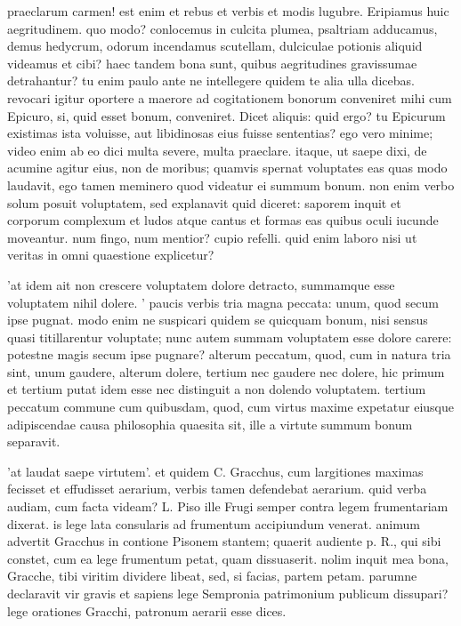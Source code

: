  praeclarum carmen! est enim et rebus et verbis et modis lugubre. Eripiamus huic aegritudinem. quo modo? conlocemus in culcita plumea, psaltriam adducamus, demus hedycrum, odorum incendamus scutellam, dulciculae potionis aliquid videamus et cibi? haec tandem bona sunt, quibus aegritudines gravissumae detrahantur? tu enim paulo ante ne intellegere quidem te alia ulla dicebas. revocari igitur oportere a maerore ad cogitationem bonorum conveniret mihi cum Epicuro, si, quid esset bonum, conveniret. Dicet aliquis: quid ergo? tu Epicurum existimas ista voluisse, aut libidinosas eius fuisse sententias? ego vero minime; video enim ab eo dici multa severe, multa praeclare. itaque, ut saepe dixi, de acumine agitur eius, non de moribus; quamvis spernat voluptates eas quas modo laudavit, ego tamen meminero quod videatur ei summum bonum. non enim verbo solum posuit voluptatem, sed explanavit quid diceret: saporem inquit et corporum complexum et ludos atque cantus et formas eas quibus oculi iucunde moveantur. num fingo, num mentior? cupio refelli. quid enim laboro nisi ut veritas in omni quaestione explicetur?

 'at idem ait non crescere voluptatem dolore detracto, summamque esse voluptatem nihil dolere. ' paucis verbis tria magna peccata: unum, quod secum ipse pugnat. modo enim ne suspicari quidem se quicquam bonum, nisi sensus quasi titillarentur voluptate; nunc autem summam voluptatem esse dolore carere: potestne magis secum ipse pugnare? alterum peccatum, quod, cum in natura tria sint, unum gaudere, alterum dolere, tertium nec gaudere nec dolere, hic primum et tertium putat idem esse nec distinguit a non dolendo voluptatem. tertium peccatum commune cum quibusdam, quod, cum virtus maxime expetatur eiusque adipiscendae causa philosophia quaesita sit, ille a virtute summum bonum separavit.

 'at laudat saepe virtutem'. et quidem C. Gracchus, cum largitiones maximas fecisset et effudisset aerarium, verbis tamen defendebat aerarium. quid verba audiam, cum facta videam? L. Piso ille Frugi semper contra legem frumentariam dixerat. is lege lata consularis ad frumentum accipiundum venerat. animum advertit Gracchus in contione Pisonem stantem; quaerit audiente p. R., qui sibi constet, cum ea lege frumentum petat, quam dissuaserit. nolim inquit mea bona, Gracche, tibi viritim dividere libeat, sed, si facias, partem petam. parumne declaravit vir gravis et sapiens lege Sempronia patrimonium publicum dissupari? lege orationes Gracchi, patronum aerarii esse dices.

